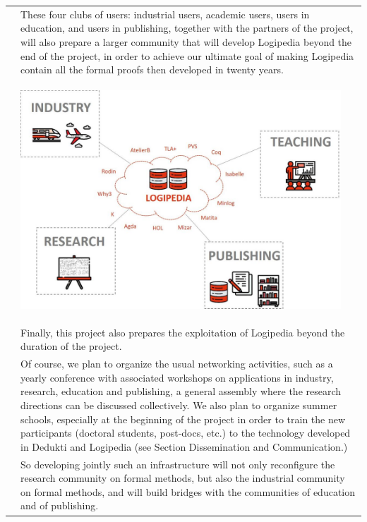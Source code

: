 \begin{longtable}{|p{}|p{}|}
&
\hspace{0.4cm}
These four clubs of users: industrial users, academic users, users in 
education, and users in publishing, together with the partners of the 
project, will also
prepare a larger community that will develop Logipedia beyond the end
of the project, in order to achieve our ultimate goal of making
Logipedia contain all the formal proofs then developed in twenty
years.\\
&
\begin{center}
\includegraphics[width=12cm]{img/Schema-reduced}
\end{center}\\
&
\hspace{0.4cm}
Finally, this project also prepares the exploitation of Logipedia
beyond the duration of the project.\\
&
\hspace{0.4cm}
Of course, we plan to organize the usual networking activities,
such as a yearly conference with associated workshops on applications
in industry, research, education and publishing, a general assembly
where the research directions can be discussed collectively. We also plan to organize
summer schools, especially at the beginning of the project in order to
train the new participants (doctoral students, post-docs, etc.) to the
technology developed in Dedukti and Logipedia
(see Section Dissemination and Communication.)\\
&
\hspace{0.4cm}
So developing jointly such an infrastructure will not only reconfigure
the research community on formal methods, but also the industrial
community on formal methods, and will build bridges with the communities
of education and of publishing.\\

\end{longtable}
